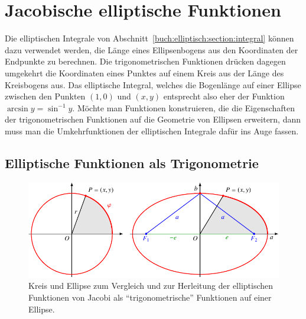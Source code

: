 %
%
%
\section{Jacobische elliptische Funktionen
\label{buch:elliptisch:section:jacobi}}
Die elliptischen Integrale von
Abschnitt~\ref{buch:elliptisch:section:integral}
können dazu verwendet werden, die Länge eines Ellipsenbogens aus
den Koordinaten der Endpunkte zu berechnen.
Die trigonometrischen Funktionen drücken dagegen umgekehrt die
Koordinaten eines Punktes auf einem Kreis aus der Länge des
Kreisbogens aus.
Das elliptische Integral, welches die Bogenlänge auf einer Ellipse zwischen
den Punkten $(1,0)$ und $(x,y)$ entsprecht also eher der Funktion
$\arcsin y=\sin^{-1}y$.
Möchte man Funktionen konstruieren, die die Eigenschaften der 
trigonometrischen Funktionen auf die Geometrie von Ellipsen erweitern,
dann muss man die Umkehrfunktionen der elliptischen Integrale dafür ins
Auge fassen.

%
%
\subsection{Elliptische Funktionen als Trigonometrie}
\begin{figure}
\centering
\includegraphics{chapters/110-elliptisch/images/ellipse.pdf}
\caption{Kreis und Ellipse zum Vergleich und zur Herleitung der 
elliptischen Funktionen von Jacobi als ``trigonometrische'' Funktionen
auf einer Ellipse.
\label{buch:elliptisch:fig:ellipse}}
\end{figure}

%
%
